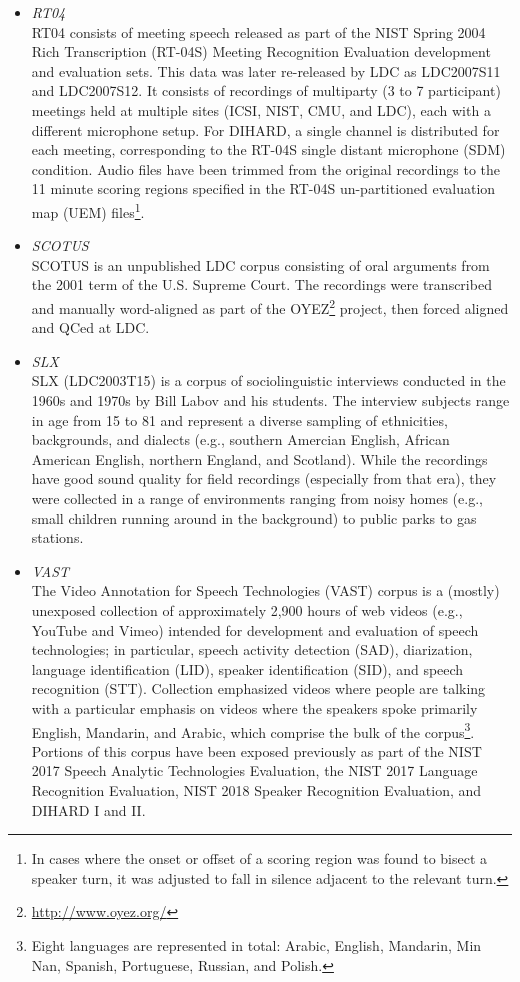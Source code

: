 \documentclass{article}
\begin{document}
\begin{appendices}
\begin{itemize}
        \item {\it RT04} \\
            RT04 consists of meeting speech released as part of the NIST Spring 2004 Rich Transcription (RT-04S) Meeting Recognition Evaluation development and evaluation sets. This data was later re-released by LDC as LDC2007S11 and LDC2007S12. It consists of recordings of multiparty (3 to 7 participant) meetings held at multiple sites (ICSI, NIST, CMU, and LDC), each with a different microphone setup. For DIHARD, a single channel is distributed for each meeting, corresponding to the RT-04S single distant microphone (SDM) condition. Audio files have been trimmed from the original recordings to the 11 minute scoring regions specified in the RT-04S un-partitioned evaluation map (UEM) files\footnote{In cases where the onset or offset of a scoring region was found to bisect a speaker turn, it was adjusted to fall in silence adjacent to the relevant turn.}.
        \item {\it SCOTUS} \\
            SCOTUS is an unpublished LDC corpus consisting of oral arguments from the 2001 term of the U.S. Supreme Court. The recordings were transcribed and manually word-aligned as part of the OYEZ\footnote{\url{http://www.oyez.org/}} project, then forced aligned and QCed at LDC.
        \item {\it SLX} \\
            SLX (LDC2003T15) is a corpus of sociolinguistic interviews conducted in the 1960s and 1970s by Bill Labov and his students. The interview subjects range in age from 15 to 81 and represent a diverse sampling of ethnicities, backgrounds, and dialects (e.g., southern Amercian English, African American English, northern England, and Scotland). While the recordings have good sound quality for field recordings (especially from that era), they were collected in a range of environments ranging from noisy homes (e.g., small children running around in the background) to public parks to gas stations.
        \item {\it VAST} \\
            The Video Annotation for Speech Technologies (VAST) corpus is a (mostly) unexposed collection of approximately 2,900 hours of web videos (e.g., YouTube and Vimeo) intended for development and evaluation of speech technologies; in particular, speech activity detection (SAD), diarization, language identification (LID), speaker identification (SID), and speech recognition (STT). Collection emphasized videos where people are talking with a particular emphasis on videos where the speakers spoke primarily English, Mandarin, and Arabic, which comprise the bulk of the corpus\footnote{Eight languages are represented in total: Arabic, English, Mandarin, Min Nan, Spanish, Portuguese, Russian, and Polish.}. Portions of this corpus have been exposed previously as part of the NIST 2017 Speech Analytic Technologies Evaluation, the  NIST 2017 Language Recognition Evaluation, NIST 2018 Speaker Recognition Evaluation, and DIHARD I and II.

\end{itemize}
\end{appendices}
\end{document}
